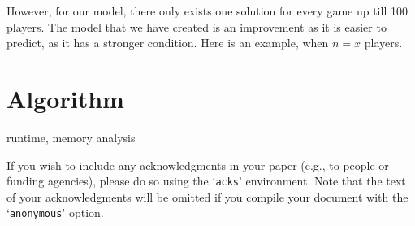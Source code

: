\documentclass[sigconf,anonymous]{aamas}
\newcommand{\ykc}[1]{{\color{blue} #1}}
\newcommand{\BibTeX}{\rm B\kern-.05em{\sc i\kern-.025em b}\kern-.08em\TeX}
\begin{document}
However, for our model, there only exists one solution for every game up till 100 players. The model that we have created is an improvement as it is easier to predict, as it has a stronger condition. Here is an example, when $n = x$ players. 
\section{Algorithm}

\ykc{runtime, memory analysis}


%  
%   
%   
%



\begin{acks}
If you wish to include any acknowledgments in your paper (e.g., to 
people or funding agencies), please do so using the `\texttt{acks}' 
environment. Note that the text of your acknowledgments will be omitted
if you compile your document with the `\texttt{anonymous}' option.
\end{acks}
\end{document}
